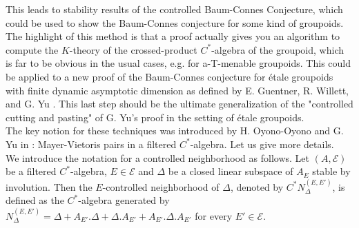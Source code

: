 This leads to stability results of the controlled Baum-Connes Conjecture, which could be used to show the Baum-Connes conjecture for some kind of groupoids. The highlight of this method is that a proof actually gives you an algorithm to compute the $K$-theory of the crossed-product $C^*$-algebra of the groupoid, which is far to be obvious in the usual cases, e.g. for a-T-menable groupoids. %
This could be applied to a new proof of the Baum-Connes conjecture for étale groupoids with finite dynamic asymptotic dimension as defined by E. Guentner, R. Willett, and G. Yu \cite{GWY}. This last step should be the ultimate generalization of the "controlled cutting and pasting" of G. Yu's proof \cite{Yu1} in the setting of étale groupoids.\\

The key notion for these techniques was introduced by H. Oyono-Oyono and G. Yu in \cite{OY4} : Mayer-Vietoris pairs in a filtered $C^*$-algebra. Let us give more details. \\

We introduce the notation for a controlled neighborhood as follows. Let $(A,\mathcal E)$ be a filtered $C^*$-algebra, $E\in\mathcal E$ and $\Delta$ be a closed linear subspace of $A_E$ stable by involution. Then the $E$-controlled neighborhood of $\Delta$, denoted by $C^* N_{\Delta}^{(E,E')}$, is defined as the $C^*$-algebra generated by $N_{\Delta}^{(E,E')} = \Delta + A_{E'}.\Delta +\Delta. A_{E'} + A_{E'}.\Delta.A_{E'} $ for every $E'\in\mathcal E$.

